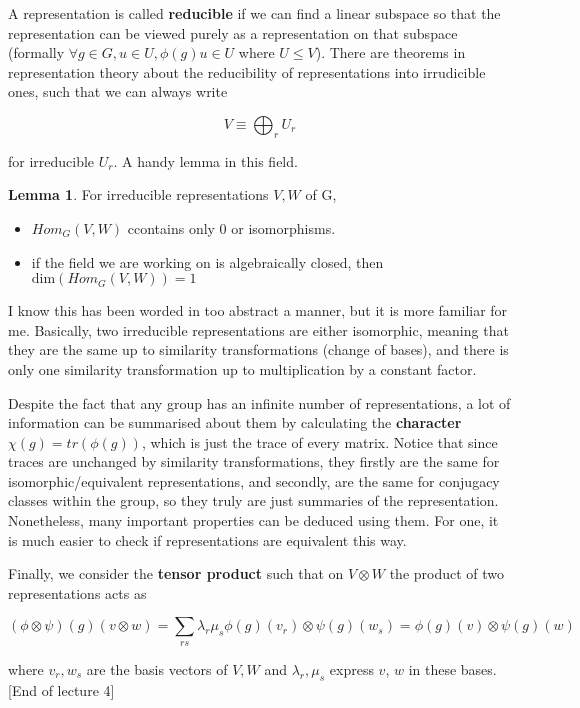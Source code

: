 \documentclass{article}
\theoremstyle{definition}
\newtheorem{lemma}{Lemma}
\begin{document}
A representation is called \textbf{reducible} if we can find a linear subspace
so that the representation can be viewed purely as a representation on that
subspace (formally $\forall g \in G, u \in U, \phi(g) u \in U$ where $U \leq
V$). There are theorems in representation theory about the reducibility of
representations into irrudicible ones, such that we can always write

$$ V \equiv \bigoplus_r U_r $$

for irreducible $U_r$. A handy lemma in this field.

\begin{lemma}
  For irreducible representations $V, W$ of G,
  \begin{itemize}
  \item $Hom_G(V, W)$ ccontains only 0 or isomorphisms.
  \item if the field we are working on is algebraically closed, then
    $\text{dim} (Hom_G(V, W)) = 1$ 
  \end{itemize}
\end{lemma}

I know this has been worded in too abstract a manner, but it is more familiar
for me. Basically, two irreducible representations are either isomorphic,
meaning that they are the same up to similarity transformations (change of
bases), and there is only one similarity transformation up to multiplication by
a constant factor.

Despite the fact that any group has an infinite number of representations, a lot
of information can be summarised about them by calculating the
\textbf{character} $\chi(g) = tr(\phi(g))$, which is just the trace of every
matrix. Notice that since traces are unchanged by similarity transformations,
they firstly are the same for isomorphic/equivalent representations, and
secondly, are the same for conjugacy classes within the group, so they truly are
just summaries of the representation. Nonetheless, many important properties can
be deduced using them. For one, it is much easier to check if representations
are equivalent this way.

Finally, we consider the \textbf{tensor product} such that on $V \otimes W$
the product of two representations acts as

$$ (\phi \otimes \psi) (g) (v \otimes w) = \sum_{rs} \lambda_r \mu_s \phi(g)(v_r)
\otimes \psi(g)(w_s) = \phi(g)(v) \otimes \psi(g)(w) $$

where $v_r, w_s$ are the basis vectors of $V, W$ and $\lambda_r, \mu_s$ express
$v$, $w$ in these bases. [End of lecture 4]
\end{document}
